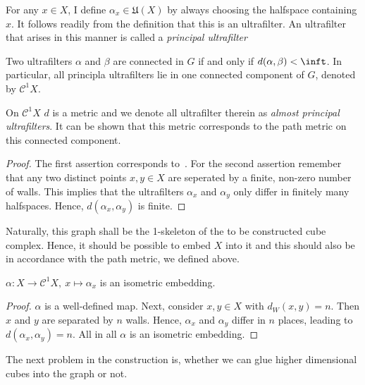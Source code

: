 \begin{defin}
  For any \(x \in X\), I define \(\alpha_x \in \mathfrak{U}(X)\) by always choosing the halfspace containing \(x\). It follows readily from the definition that this is an ultrafilter. An ultrafilter that arises in this manner is called a \emph{principal ultrafilter}
\end{defin}

\begin{lemma}
Two ultrafilters \(\alpha\) and \(\beta\) are connected in \(G\) if and only if \(d(\alpha, \beta) < \inft\). In particular, all principla ultrafilters lie in one connected component of \(G\), denoted by \(\mathcal{C}^1X\). 
\end{lemma}

\begin{rem}
  On \(\mathcal{C}^1X\) \(d\) is a metric and we denote all ultrafilter therein as \emph{almost principal ultrafilters}. It can be shown that this metric corresponds to the path metric on this connected component.
\end{rem}

\begin{proof}
  The first assertion corresponds to~\cite[Lemma 4.4]{Nica2004}. For the second assertion remember that any two distinct points \(x,y \in X\) are seperated by a finite, non-zero number of walls. This implies that the ultrafilters \(\alpha_x\) and \(\alpha_y\) only differ in finitely many halfspaces. Hence, \(d(\alpha_x, \alpha_y)\) is finite.
\end{proof}

Naturally, this graph shall be the 1-skeleton of the to be constructed cube complex. Hence, it should be possible to embed \(X\) into it and this should also be in accordance with the path metric, we defined above.

\begin{lemma}
  \(\alpha\colon X \to \mathcal{C}^1X,\ x \mapsto \alpha_x\) is an isometric embedding.
\end{lemma}

\begin{proof}
  \(\alpha\) is a well-defined map. Next, consider \(x,y \in X\) with \(d_W(x,y) = n\). Then \(x\) and \(y\) are separated by \(n\) walls. Hence, \(\alpha_x\) and \(\alpha_y\) differ in \(n\) places, leading to \(d(\alpha_x, \alpha_y) = n\). All in all \(\alpha\) is an isometric embedding.
\end{proof}

The next problem in the construction is, whether we can glue higher dimensional cubes into the graph or not. 

